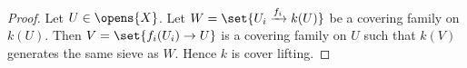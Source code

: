\begin{proof}
Let $U \in \opens{X}$.
Let $W = \set{U_i\xrightarrow{f_i} k(U)}$ be a covering family on $k(U)$.
Then $V = \set{f_i(U_i) \rightarrow U}$ is a covering family on $U$
such that $k(V)$ generates the same sieve as $W$.
Hence $k$ is cover lifting. 
\end{proof}